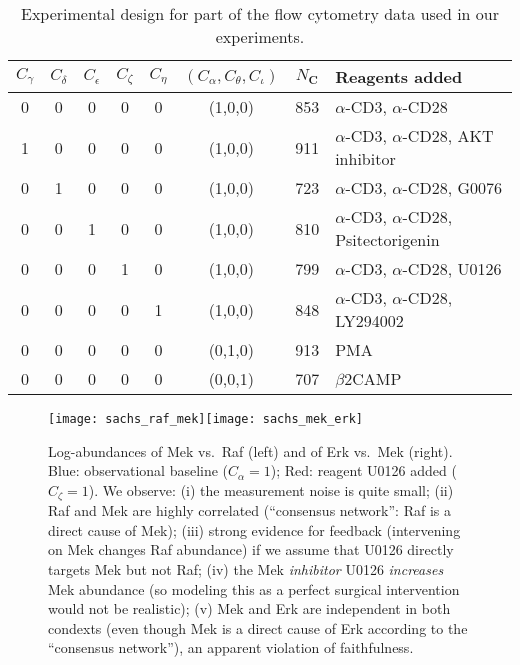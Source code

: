 \documentclass[twoside,11pt]{article}
\newcommand\B[1]{\bm{#1}}
\newcommand{\Joris}[1]{{\color{blue}#1}}
\newcommand{\Spirtes}[1]{{\color{red}#1}}
\begin{document}
\begin{table}\centering
\caption{Experimental design for part of the \citep{SPP05} flow cytometry data used in our experiments.\label{tab:sachs_experimental_design_used}}
{\small\begin{tabular}{|cccccc|c|l|}
\hline
  $C_\gamma$ & $C_\delta$ & $C_\epsilon$ & $C_\zeta$ & $C_\eta$ & $(C_\alpha,C_\theta,C_\iota)$ & $N_{\B{C}}$ & Reagents added \\
\hline
  0 & 0 & 0 & 0 & 0 & (1,0,0) & 853 & $\alpha$-CD3, $\alpha$-CD28\\
  1 & 0 & 0 & 0 & 0 & (1,0,0) & 911 & $\alpha$-CD3, $\alpha$-CD28, AKT inhibitor\\
  0 & 1 & 0 & 0 & 0 & (1,0,0) & 723 & $\alpha$-CD3, $\alpha$-CD28, G0076\\
  0 & 0 & 1 & 0 & 0 & (1,0,0) & 810 & $\alpha$-CD3, $\alpha$-CD28, Psitectorigenin\\
  0 & 0 & 0 & 1 & 0 & (1,0,0) & 799 & $\alpha$-CD3, $\alpha$-CD28, U0126\\
  0 & 0 & 0 & 0 & 1 & (1,0,0) & 848 & $\alpha$-CD3, $\alpha$-CD28, LY294002\\
  0 & 0 & 0 & 0 & 0 & (0,1,0) & 913 & PMA\\
  0 & 0 & 0 & 0 & 0 & (0,0,1) & 707 & $\beta$2CAMP\\
\hline
\end{tabular}}\end{table}

\begin{figure}
  \centerline{\texttt{[image: sachs\_raf\_mek]}\hfill\texttt{[image: sachs\_mek\_erk]}}
  \caption{Log-abundances of Mek vs.\ Raf (left) and of Erk vs.\ Mek (right). Blue: observational baseline ($C_\alpha=1$); Red: reagent U0126 added ($C_\zeta=1$). We observe: (i) the measurement noise is quite small; (ii) Raf and
  Mek are highly correlated (``consensus network'': Raf is a direct cause of Mek); 
  (iii) strong evidence for feedback (intervening on Mek changes Raf abundance) if we assume that U0126 directly
  targets Mek but not Raf; (iv) the Mek \emph{inhibitor} U0126 \emph{increases} Mek abundance (so modeling this as a perfect
  surgical intervention would not be realistic); (v) Mek and Erk are independent in both condexts
  (even though Mek is a direct cause of Erk according to the ``consensus network''), an apparent violation of
  faithfulness.\label{fig:raf_mek_erk}}
\end{figure}

\end{document}
